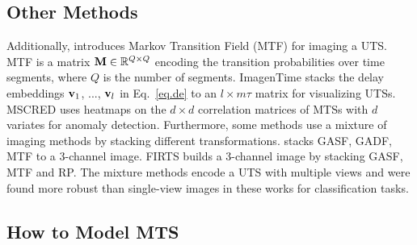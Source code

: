 
\subsection{Other Methods}\label{sec.othermethod}

Additionally, %
\cite{wang2015encoding} introduces Markov Transition Field (MTF) for imaging a UTS. %
MTF is a matrix ${\bf M}\in\mathbb{R}^{Q\times Q}$ encoding the transition probabilities over time segments, where $Q$ is the number of segments. %
ImagenTime \cite{naiman2024utilizing} stacks the delay embeddings ${\bf v}_{1}$, ..., ${\bf v}_{l}$ in Eq.~\eqref{eq.de} to an $l\times m\tau$ matrix for visualizing UTSs. %
MSCRED \cite{zhang2019deep} uses heatmaps on the $d\times d$ correlation matrices of MTSs with $d$ variates for anomaly detection. 
Furthermore, some methods use a mixture of imaging methods by stacking different transformations. \cite{wang2015imaging} stacks GASF, GADF, MTF to a 3-channel image. %
FIRTS \cite{costa2024fusion} builds a 3-channel image by stacking GASF, MTF and RP. %
The mixture methods encode a UTS with multiple views and were found more robust than single-view images in these works for %
classification tasks.

\subsection{How to Model MTS}\label{sec.modelmts}

